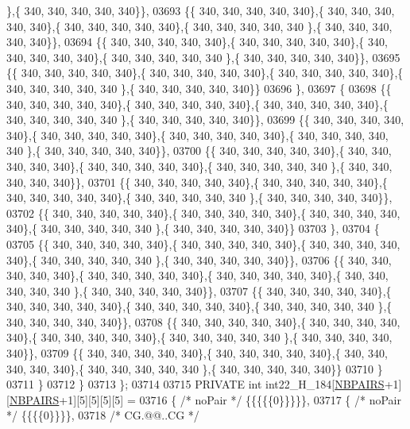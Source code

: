 \begin{DoxyCode}
      \},\{ 340, 340, 340, 340, 340\}\},
03693 \{\{ 340, 340, 340, 340, 340\},\{ 340, 340, 340, 340, 340\},\{ 340, 340, 340, 340, 340\},\{ 340, 340, 340, 340, 340
      \},\{ 340, 340, 340, 340, 340\}\},
03694 \{\{ 340, 340, 340, 340, 340\},\{ 340, 340, 340, 340, 340\},\{ 340, 340, 340, 340, 340\},\{ 340, 340, 340, 340, 340
      \},\{ 340, 340, 340, 340, 340\}\},
03695 \{\{ 340, 340, 340, 340, 340\},\{ 340, 340, 340, 340, 340\},\{ 340, 340, 340, 340, 340\},\{ 340, 340, 340, 340, 340
      \},\{ 340, 340, 340, 340, 340\}\}
03696 \},
03697 \{
03698 \{\{ 340, 340, 340, 340, 340\},\{ 340, 340, 340, 340, 340\},\{ 340, 340, 340, 340, 340\},\{ 340, 340, 340, 340, 340
      \},\{ 340, 340, 340, 340, 340\}\},
03699 \{\{ 340, 340, 340, 340, 340\},\{ 340, 340, 340, 340, 340\},\{ 340, 340, 340, 340, 340\},\{ 340, 340, 340, 340, 340
      \},\{ 340, 340, 340, 340, 340\}\},
03700 \{\{ 340, 340, 340, 340, 340\},\{ 340, 340, 340, 340, 340\},\{ 340, 340, 340, 340, 340\},\{ 340, 340, 340, 340, 340
      \},\{ 340, 340, 340, 340, 340\}\},
03701 \{\{ 340, 340, 340, 340, 340\},\{ 340, 340, 340, 340, 340\},\{ 340, 340, 340, 340, 340\},\{ 340, 340, 340, 340, 340
      \},\{ 340, 340, 340, 340, 340\}\},
03702 \{\{ 340, 340, 340, 340, 340\},\{ 340, 340, 340, 340, 340\},\{ 340, 340, 340, 340, 340\},\{ 340, 340, 340, 340, 340
      \},\{ 340, 340, 340, 340, 340\}\}
03703 \},
03704 \{
03705 \{\{ 340, 340, 340, 340, 340\},\{ 340, 340, 340, 340, 340\},\{ 340, 340, 340, 340, 340\},\{ 340, 340, 340, 340, 340
      \},\{ 340, 340, 340, 340, 340\}\},
03706 \{\{ 340, 340, 340, 340, 340\},\{ 340, 340, 340, 340, 340\},\{ 340, 340, 340, 340, 340\},\{ 340, 340, 340, 340, 340
      \},\{ 340, 340, 340, 340, 340\}\},
03707 \{\{ 340, 340, 340, 340, 340\},\{ 340, 340, 340, 340, 340\},\{ 340, 340, 340, 340, 340\},\{ 340, 340, 340, 340, 340
      \},\{ 340, 340, 340, 340, 340\}\},
03708 \{\{ 340, 340, 340, 340, 340\},\{ 340, 340, 340, 340, 340\},\{ 340, 340, 340, 340, 340\},\{ 340, 340, 340, 340, 340
      \},\{ 340, 340, 340, 340, 340\}\},
03709 \{\{ 340, 340, 340, 340, 340\},\{ 340, 340, 340, 340, 340\},\{ 340, 340, 340, 340, 340\},\{ 340, 340, 340, 340, 340
      \},\{ 340, 340, 340, 340, 340\}\}
03710 \}
03711 \}
03712 \}
03713 \};
03714 
03715 PRIVATE \textcolor{keywordtype}{int} int22\_H\_184[\hyperlink{constants_8h_a5e75221c779d618eab81e096f37e32ce}{NBPAIRS}+1][\hyperlink{constants_8h_a5e75221c779d618eab81e096f37e32ce}{NBPAIRS}+1][5][5][5][5] =
03716 \{ \textcolor{comment}{/* noPair */} \{\{\{\{\{0\}\}\}\}\},
03717 \{ \textcolor{comment}{/* noPair */} \{\{\{\{0\}\}\}\},
03718 \textcolor{comment}{/* CG.@@..CG */}

\end{DoxyCode}
